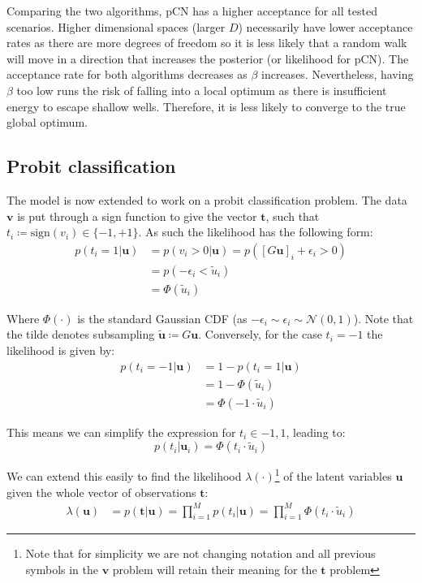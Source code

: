 \documentclass[]{article}
\newcommand{\Ncal}{\mathcal{N}}
\newcommand{\lik}{\lambda}
\newcommand{\tbold}{\boldsymbol{t}}
\newcommand{\ubold}{\boldsymbol{u}}
\newcommand{\vbold}{\boldsymbol{v}}
\begin{document}
Comparing the two algorithms, pCN has a higher acceptance for all tested scenarios. Higher dimensional spaces (larger $D$) necessarily have lower acceptance rates as there are more degrees of freedom so it is less likely that a random walk will move in a direction that increases the posterior (or likelihood for pCN). The acceptance rate for both algorithms decreases as $\beta$ increases. Nevertheless, having $\beta$ too low runs the risk of falling into a local optimum as there is insufficient energy to escape shallow wells. Therefore, it is less likely to converge to the true global optimum.

\subsection{Probit classification}

The model is now extended to work on a probit classification problem. The data $\vbold$ is put through a sign function to give the vector $\tbold$, such that $t_i \coloneqq \textrm{sign}(v_i) \in \{-1, +1\}$. As such the likelihood has the following form:
%
\begin{align}
	p(t_i = 1 | \ubold) &= p(v_i > 0 | \ubold) = p([G\ubold]_i + \epsilon_i > 0) \nonumber \\
	&= p(-\epsilon_i < \tilde{u}_i ) \nonumber \\
	&= \Phi(\tilde{u}_i)
\end{align}

Where $\Phi(\cdot)$ is the standard Gaussian CDF (as $-\epsilon_i \sim \epsilon_i \sim \Ncal(0,1)$). Note that the tilde denotes subsampling $\tilde{\ubold} \coloneqq G\ubold$. Conversely, for the case $t_i = -1$ the likelihood is given by:
%
\begin{align}
	p(t_i = -1 | \ubold) &= 1 - p(t_i = 1 | \ubold) \nonumber \\
	&= 1 - \Phi(\tilde{u}_i) \nonumber \\
	&= \Phi(-1 \cdot \tilde{u}_i)
\end{align}

This means we can simplify the expression for $t_i \in {-1, 1}$, leading to:
%
\begin{equation}
	p(t_i | \ubold_i) = \Phi(t_i \cdot \tilde{u}_i)
\end{equation}

We can extend this easily to find the likelihood $\lik(\cdot)$\footnote{Note that for simplicity we are not changing notation and all previous symbols in the $\vbold$ problem will retain their meaning for the $\tbold$ problem} of the latent variables $\ubold$ given the whole vector of observations $\tbold$:
%
\begin{align}
	\lik(\ubold) &= p(\tbold | \ubold) = \prod_{i=1}^{M} p(t_i | \ubold) = \prod_{i=1}^{M} \Phi(t_i \cdot \tilde{u}_i)
\end{align}
\end{document}
